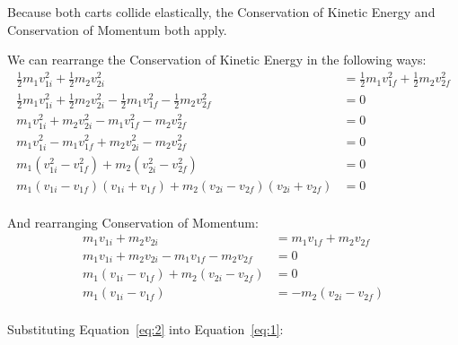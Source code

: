 \begin{Answer}[ref=carts_elastic]
Because both carts collide elastically, the Conservation of Kinetic Energy and Conservation of Momentum both apply.

We can rearrange the Conservation of Kinetic Energy in the following ways:
\begin{align*}
\frac{1}{2}m_1 v_{1i}^2 + \frac{1}{2}m_2 v_{2i}^2&=\frac{1}{2}m_1 v_{1f}^2 + \frac{1}{2}m_2 v_{2f}^2 \\ 
\frac{1}{2}m_1 v_{1i}^2 + \frac{1}{2}m_2 v_{2i}^2 - \frac{1}{2}m_1 v_{1f}^2 - \frac{1}{2}m_2 v_{2f}^2 &= 0\\ 
m_1 v_{1i}^2 + m_2 v_{2i}^2 - m_1 v_{1f}^2 - m_2 v_{2f}^2 &= 0\\ 
m_1 v_{1i}^2 - m_1 v_{1f}^2 + m_2 v_{2i}^2 - m_2 v_{2f}^2 &= 0 \\ 
m_1 (v_{1i}^2 - v_{1f}^2) + m_2 (v_{2i}^2 -  v_{2f}^2) &= 0 \\ 
m_1 (v_{1i} - v_{1f})(v_{1i} + v_{1f})+m_2 (v_{2i} - v_{2f})(v_{2i} + v_{2f}) &= 0 \tag{1}\label{eq:1}\\
\end{align*}

And rearranging Conservation of Momentum:
\begin{align*}
  m_1 v_{1i} + m_2 v_{2i} &= m_1 v_{1f} + m_2 v_{2f} \\
  m_1 v_{1i} + m_2 v_{2i} - m_1 v_{1f} - m_2 v_{2f} &= 0\\
  m_1 (v_{1i} - v_{1f}) + m_2 (v_{2i} - v_{2f}) &= 0 \\
  m_1 (v_{1i} - v_{1f}) &= -m_2 (v_{2i} - v_{2f}) \tag{2}\label{eq:2}\\
\end{align*}

Substituting Equation~\eqref{eq:2} into Equation~\eqref{eq:1}:


\end{Answer}

